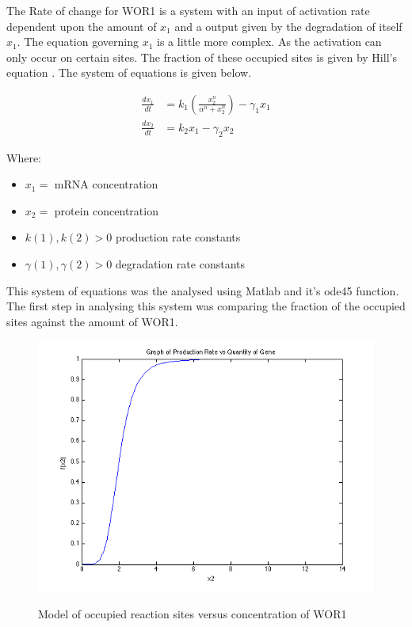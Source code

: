 \documentclass[]{article}
\begin{document}
The Rate of change for WOR1 is a system with an input of activation rate dependent upon the amount of $x_1$ and a output given by the degradation of itself $x_1$. The equation governing $x_1$ is a little more complex. As the activation can only occur on certain sites. The fraction of these occupied sites is given by Hill's equation \cite{Hill}. The system of equations is given below.

\begin{align}
\frac{dx_1}{dt} &= k_1\left(\frac{x_2^n}{\alpha^n + x_2^n}\right) - \gamma_1x_1\\
\frac{dx_2}{dt} &= k_2x_1 -\gamma_2x_2
\label{eq:posfeed}
\end{align}

Where:
\begin{itemize}
	\item $x_1 =$ mRNA concentration
	\item $x_2 =$ protein concentration
	\item $k(1), k(2) > 0$ production rate constants
	\item $\gamma(1), \gamma(2) > 0$ degradation rate constants
\end{itemize}


This system of equations was the analysed using Matlab and it's ode45 function. The first step in analysing this system was comparing the fraction of the occupied sites against the amount of WOR1. 

\begin{figure}[h]
\caption{Model of occupied reaction sites versus concentration of WOR1}
\centering
\includegraphics[scale = 0.5]{prodRateVsQuant.png}
\label{fig:Hill}
\end{figure}
\end{document}
